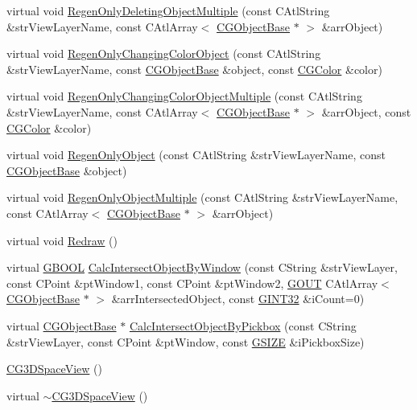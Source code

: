 \begin{DoxyCompactItemize}
virtual void \hyperlink{class_c_g3_d_space_view_ac29abf1bd75a5f266acd6d587e3cfcb2}{Regen\+Only\+Deleting\+Object\+Multiple} (const C\+Atl\+String \&str\+View\+Layer\+Name, const C\+Atl\+Array$<$ \hyperlink{class_c_g_object_base}{C\+G\+Object\+Base} $\ast$ $>$ \&arr\+Object)
\item 
virtual void \hyperlink{class_c_g3_d_space_view_afc8d6edb1671e556d7117526ae9fa557}{Regen\+Only\+Changing\+Color\+Object} (const C\+Atl\+String \&str\+View\+Layer\+Name, const \hyperlink{class_c_g_object_base}{C\+G\+Object\+Base} \&object, const \hyperlink{class_c_g_color}{C\+G\+Color} \&color)
\item 
virtual void \hyperlink{class_c_g3_d_space_view_a2c32fa92784c1093a196342233168b8c}{Regen\+Only\+Changing\+Color\+Object\+Multiple} (const C\+Atl\+String \&str\+View\+Layer\+Name, const C\+Atl\+Array$<$ \hyperlink{class_c_g_object_base}{C\+G\+Object\+Base} $\ast$ $>$ \&arr\+Object, const \hyperlink{class_c_g_color}{C\+G\+Color} \&color)
\item 
virtual void \hyperlink{class_c_g3_d_space_view_a6124759a964a034fb2ec327cc12364f6}{Regen\+Only\+Object} (const C\+Atl\+String \&str\+View\+Layer\+Name, const \hyperlink{class_c_g_object_base}{C\+G\+Object\+Base} \&object)
\item 
virtual void \hyperlink{class_c_g3_d_space_view_ad30a8db3cc9853abdcd598e170850c1f}{Regen\+Only\+Object\+Multiple} (const C\+Atl\+String \&str\+View\+Layer\+Name, const C\+Atl\+Array$<$ \hyperlink{class_c_g_object_base}{C\+G\+Object\+Base} $\ast$ $>$ \&arr\+Object)
\item 
virtual void \hyperlink{class_c_g3_d_space_view_a64c5f9295142711855fe1edac4e81574}{Redraw} ()
\item 
virtual \hyperlink{_g_types_8h_a2901915743626352a6820c5405f556dc}{G\+B\+O\+O\+L} \hyperlink{class_c_g3_d_space_view_ad35d550805ccc115a15372c63a1490a4}{Calc\+Intersect\+Object\+By\+Window} (const C\+String \&str\+View\+Layer, const C\+Point \&pt\+Window1, const C\+Point \&pt\+Window2, \hyperlink{_g_types_8h_a0858ec221262e635612871d70ca233ad}{G\+O\+U\+T} C\+Atl\+Array$<$ \hyperlink{class_c_g_object_base}{C\+G\+Object\+Base} $\ast$ $>$ \&arr\+Intersected\+Object, const \hyperlink{_g_types_8h_a40d8bc7c06b9e72906852691a4bf888e}{G\+I\+N\+T32} \&i\+Count=0)
\item 
virtual \hyperlink{class_c_g_object_base}{C\+G\+Object\+Base} $\ast$ \hyperlink{class_c_g3_d_space_view_a0ae9fca90ba5f117aa854ad3f6e6f7a4}{Calc\+Intersect\+Object\+By\+Pickbox} (const C\+String \&str\+View\+Layer, const C\+Point \&pt\+Window, const \hyperlink{_g_types_8h_ac7dd75e8df268a0368c6cb433764fdcb}{G\+S\+I\+Z\+E} \&i\+Pickbox\+Size)
\item 
\hyperlink{class_c_g3_d_space_view_a8333cc6be767deea88b494d98a5ea48b}{C\+G3\+D\+Space\+View} ()
\item 
virtual \hyperlink{class_c_g3_d_space_view_a25a8a15c94452878c764a9a322bb9437}{$\sim$\+C\+G3\+D\+Space\+View} ()
\end{DoxyCompactItemize}
